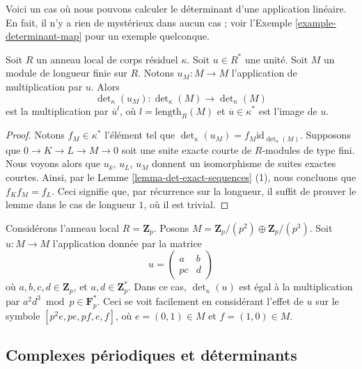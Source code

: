 \noindent
Voici un cas où nous pouvons calculer le déterminant d'une application linéaire.
En fait, il n'y a rien de mystérieux dans aucun cas ; voir
l'Exemple \ref{example-determinant-map} pour un exemple quelconque.

\begin{lemma}
\label{lemma-times-u-determinant}
Soit $R$ un anneau local de corps résiduel $\kappa$.
Soit $u \in R^*$ une unité.
Soit $M$ un module de longueur finie sur $R$.
Notons $u_M : M \to M$ l'application de multiplication par $u$.
Alors
$$
\det\nolimits_\kappa(u_M) :
\det\nolimits_\kappa(M)
\longrightarrow
\det\nolimits_\kappa(M)
$$
est la multiplication par $\overline{u}^l$, où $l = \text{length}_R(M)$
et $\overline{u} \in \kappa^*$ est l'image de $u$.
\end{lemma}

\begin{proof}
Notons $f_M \in \kappa^*$ l'élément tel que
$\det\nolimits_\kappa(u_M) = f_M \text{id}_{\det\nolimits_\kappa(M)}$.
Supposons que $0 \to K \to L \to M \to 0$ soit une suite exacte
courte de $R$-modules de type fini. Nous voyons alors que
$u_k$, $u_L$, $u_M$ donnent un isomorphisme de suites exactes courtes.
Ainsi, par le Lemme \ref{lemma-det-exact-sequences} (1), nous concluons que
$f_K f_M = f_L$.
Ceci signifie que, par récurrence sur la longueur, il suffit de prouver le
lemme dans le cas de longueur $1$, où il est trivial.
\end{proof}

\begin{example}
\label{example-determinant-map}
Considérons l'anneau local $R = \mathbf{Z}_p$.
Posons $M = \mathbf{Z}_p/(p^2) \oplus \mathbf{Z}_p/(p^3)$.
Soit $u : M \to M$ l'application donnée par la matrice
$$
u =
\left(
\begin{matrix}
a & b \\
pc & d
\end{matrix}
\right)
$$
où $a, b, c, d \in \mathbf{Z}_p$, et $a, d \in \mathbf{Z}_p^*$.
Dans ce cas, $\det_\kappa(u)$ est égal à la multiplication par
$a^2d^3 \bmod p \in \mathbf{F}_p^*$. Ceci se voit facilement
en considérant l'effet de $u$ sur le symbole
$[p^2e, pe, pf, e, f]$, où $e = (0 , 1) \in M$ et
$f = (1, 0) \in M$.
\end{example}





\subsection{Complexes périodiques et déterminants}
\label{subsection-periodic-complexes-determinants}

